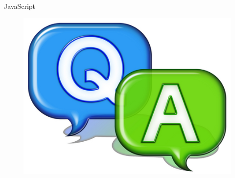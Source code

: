 \documentclass[14pt]{beamer}
\begin{document}
\begin{frame}{JavaScript}
 \begin{figure}[H]
    \includegraphics[scale=.3]{qa.png}   
   \end{figure}
\end{frame}
\end{document}
